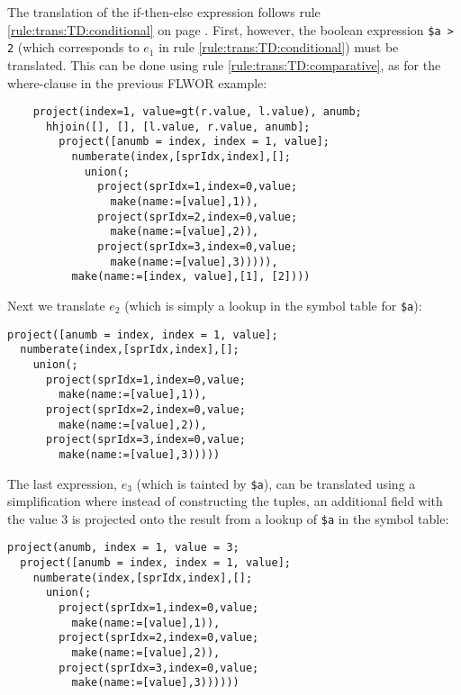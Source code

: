 
The translation of the if-then-else expression follows rule
\ref{rule:trans:TD:conditional}  on page \pageref{rule:trans:TD:conditional}.
First, however, the boolean expression \texttt{\$a > 2} (which corresponds to
$e_1$ in rule \ref{rule:trans:TD:conditional}) must be translated. This can be
done using rule \ref{rule:trans:TD:comparative}, as for the where-clause in the
previous FLWOR example:


\begin{Verbatim}
    project(index=1, value=gt(r.value, l.value), anumb;
      hhjoin([], [], [l.value, r.value, anumb];
        project([anumb = index, index = 1, value];
          numberate(index,[sprIdx,index],[];
            union(;
              project(sprIdx=1,index=0,value;
                make(name:=[value],1)),
              project(sprIdx=2,index=0,value;
                make(name:=[value],2)),
              project(sprIdx=3,index=0,value;
                make(name:=[value],3))))),
          make(name:=[index, value],[1], [2])))
\end{Verbatim}

Next we translate $e_2$ (which is simply a lookup in the symbol table for \texttt{\$a}):

\begin{Verbatim}
project([anumb = index, index = 1, value];
  numberate(index,[sprIdx,index],[];
    union(;
      project(sprIdx=1,index=0,value;
        make(name:=[value],1)),
      project(sprIdx=2,index=0,value;
        make(name:=[value],2)),
      project(sprIdx=3,index=0,value;
        make(name:=[value],3)))))
\end{Verbatim}

The last expression, $e_3$ (which is tainted by \texttt{\$a}), can be translated
using a simplification where instead of constructing the tuples, an additional
field with the value 3 is projected onto the result from a lookup of
\texttt{\$a} in the symbol table:

\begin{Verbatim}
project(anumb, index = 1, value = 3;
  project([anumb = index, index = 1, value];
    numberate(index,[sprIdx,index],[];
      union(;
        project(sprIdx=1,index=0,value;
          make(name:=[value],1)),
        project(sprIdx=2,index=0,value;
          make(name:=[value],2)),
        project(sprIdx=3,index=0,value;
          make(name:=[value],3))))))
\end{Verbatim}

